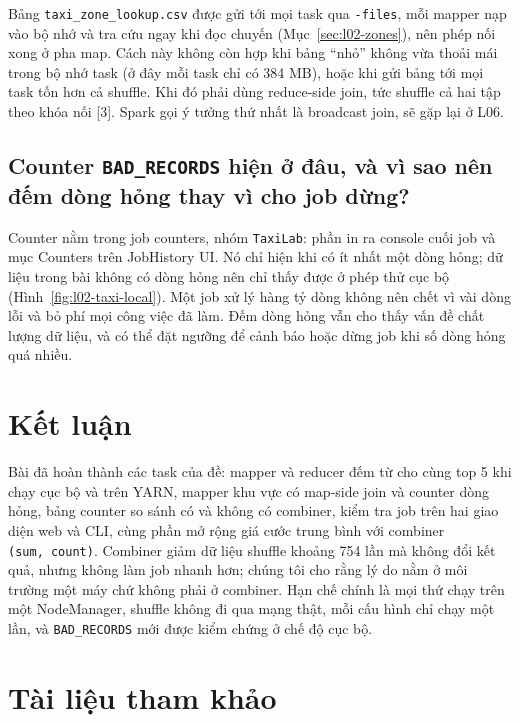 \documentclass[
  12pt,
  a4paper,
]{article}
\begin{document}
Bảng
\texttt{taxi\_}\allowbreak{}\texttt{zone\_}\allowbreak{}\texttt{lookup.}\allowbreak{}\texttt{csv}\allowbreak{}
được gửi tới mọi task qua \texttt{-files}, mỗi mapper nạp vào bộ nhớ và
tra cứu ngay khi đọc chuyến (Mục~\ref{sec:l02-zones}), nên phép nối xong
ở pha map. Cách này không còn hợp khi bảng ``nhỏ'' không vừa thoải mái
trong bộ nhớ task (ở đây mỗi task chỉ có 384 MB), hoặc khi gửi bảng tới
mọi task tốn hơn cả shuffle. Khi đó phải dùng reduce-side join, tức
shuffle cả hai tập theo khóa nối {[}3{]}. Spark gọi ý tưởng thứ nhất là
broadcast join, sẽ gặp lại ở L06.

\subsection{\texorpdfstring{Counter \texttt{BAD\_RECORDS} hiện ở đâu, và
vì sao nên đếm dòng hỏng thay vì cho job
dừng?}{Counter BAD\_RECORDS hiện ở đâu, và vì sao nên đếm dòng hỏng thay vì cho job dừng?}}\label{sec:l02-q8}

Counter nằm trong job counters, nhóm \texttt{TaxiLab}: phần in ra
console cuối job và mục Counters trên JobHistory UI. Nó chỉ hiện khi có
ít nhất một dòng hỏng; dữ liệu trong bài không có dòng hỏng nên chỉ thấy
được ở phép thử cục bộ (Hình~\ref{fig:l02-taxi-local}). Một job xử lý
hàng tỷ dòng không nên chết vì vài dòng lỗi và bỏ phí mọi công việc đã
làm. Đếm dòng hỏng vẫn cho thấy vấn đề chất lượng dữ liệu, và có thể đặt
ngưỡng để cảnh báo hoặc dừng job khi số dòng hỏng quá nhiều.

\section{Kết luận}\label{sec:l02-conclusion}

Bài đã hoàn thành các task của đề: mapper và reducer đếm từ cho cùng top
5 khi chạy cục bộ và trên YARN, mapper khu vực có map-side join và
counter dòng hỏng, bảng counter so sánh có và không có combiner, kiểm
tra job trên hai giao diện web và CLI, cùng phần mở rộng giá cước trung
bình với combiner \texttt{(sum,\ count)}. Combiner giảm dữ liệu shuffle
khoảng 754 lần mà không đổi kết quả, nhưng không làm job nhanh hơn;
chúng tôi cho rằng lý do nằm ở môi trường một máy chứ không phải ở
combiner. Hạn chế chính là mọi thứ chạy trên một NodeManager, shuffle
không đi qua mạng thật, mỗi cấu hình chỉ chạy một lần, và
\texttt{BAD\_RECORDS} mới được kiểm chứng ở chế độ cục bộ.

\section*{Tài liệu tham khảo}\label{tuxe0i-liux1ec7u-tham-khux1ea3o}
\end{document}
